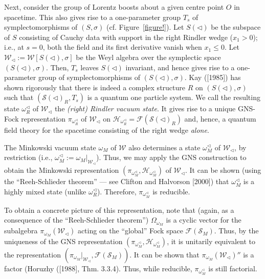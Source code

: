 \documentclass[12pt]{article}
\theoremstyle{remark}
\theoremstyle{definition}
\newcommand{\alg}[1]{\mathcal{#1}}
\newcommand{\hil}[1]{\mathcal{#1}}
\begin{document}
Next, consider the group of Lorentz boosts about a given centre point
$O$ in spacetime.  This also gives rise to a one-parameter group
$T_{s}$ of symplectomorphisms of $(S,\sigma )$ (cf.
Figure~\ref{figure!}).  Let $S(\triangleleft)$ be the subspace of $S$
consisting of Cauchy data with support in the right Rindler wedge
($x_{1}>0$); i.e., at $s=0$, both the field and its first derivative
vanish when $x_{1}\leq 0$.  Let
$\alg{W}_{\triangleleft}:=\alg{W}[S(\triangleleft),\sigma ]$ be the
Weyl algebra over the symplectic space $(S(\triangleleft),\sigma )$.
Then, $T_{s}$ leaves $S(\triangleleft)$ invariant, and hence gives
rise to a one-parameter group of symplectomorphisms of
$(S(\triangleleft),\sigma )$.  Kay ([1985]) has shown rigorously that
there is indeed a complex structure $R$ on $(S(\triangleleft),\sigma
)$ such that $(\hil{S}(\triangleleft)_{R},T_{s})$ is a quantum one
particle system.  We call the resulting state $\omega
_{R}^{\triangleleft}$ of $\alg{W}_{\triangleleft}$ the \emph{(right)
  Rindler vacuum state}.  It gives rise to a unique GNS-Fock
representation $\pi_{\omega _{R}^{\triangleleft}}$ of
$\alg{W}_{\triangleleft}$ on $\hil{H}_{\omega
  _{R}^{\triangleleft}}=\hil{F}(\hil{S}(\triangleleft)_{R})$ and,
hence, a quantum field theory for the spacetime consisting of the
right wedge \emph{alone}.  

The Minkowski vacuum state $\omega _{M}$ of $\alg{W}$ also determines a 
state $\omega _{M}^{\triangleleft}$ of 
$\alg{W}_{\triangleleft}$, by restriction (i.e., 
$\omega _{M}^{\triangleleft}:=\omega _{M}|_{\alg{W}_{\triangleleft}}$). 
 Thus, we may apply the GNS
construction to obtain the Minkowski representation $(\pi
_{\omega _{M}^{\triangleleft}},\hil{H}_{\omega _{M}^{\triangleleft}})$ 
of $\alg{W}_{\triangleleft}$.  It can be shown (using the 
``Reeh-Schlieder theorem'' --- see Clifton and Halvorson [2000]) 
that $\omega _{M}^{\triangleleft}$ is a highly mixed state 
(unlike $\omega _{R}^{\triangleleft}$).  Therefore, $\pi
_{\omega _{M}^{\triangleleft}}$ is reducible.  

To obtain a concrete picture of this representation, note that (again,
as a consequence of the ``Reeh-Schlieder theorem'') $\Omega _{\omega
  _{M}}$ is a cyclic vector for the subalgebra $\pi _{\omega
  _{M}}(\alg{W}_{\triangleleft})$ acting on the ``global'' Fock space
$\hil{F}(\hil{S}_{M})$.  Thus, by the uniqueness of the GNS
representation $(\pi_{\omega _{M}^{\triangleleft}},\hil{H}_{\omega
  _{M}^{\triangleleft}})$, it is unitarily equivalent to the
representation $(\pi _{\omega
  _{M}}|_{\alg{W}_{\triangleleft}},\hil{F}(\hil{S}_{M}))$.  It can be
shown that $\pi _{\omega _{M}}(\alg{W}_{\triangleleft})''$ is a factor
(Horuzhy ([1988], Thm. 3.3.4).  Thus, while reducible, $\pi_{\omega
  _{M}^{\triangleleft}}$ is still factorial.
   
\end{document}
